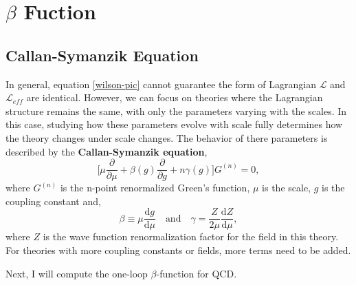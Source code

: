 \documentclass[a4paper,12pt]{article}
\renewcommand{\d}{\mathrm{d}}
\begin{document}
\section{$\beta$ Fuction\cite{Schwartz:2014sze,Peskin:1995ev}}
\subsection{Callan-Symanzik Equation}
In general, equation \eqref{wilson-pic} cannot guarantee the form of Lagrangian $\mathcal{L}$ and $\mathcal{L}_{eff}$ are identical. 
However, we can focus on theories where the Lagrangian structure remains the same, with only the parameters varying with the scales.
In this case, studying how these parameters evolve with scale fully determines how the theory changes under scale changes.
The behavior of there parameters is described by the \textbf{Callan-Symanzik equation},
\begin{equation}
    \bigg[\mu\frac{\partial}{\partial \mu}+\beta(g)\frac{\partial}{\partial g}+n \gamma(g)\bigg]G^{(n)}=0,
\end{equation}
where $G^{(n)}$ is the n-point renormalized Green's function, $\mu$ is the scale, $g$ is the coupling constant and,
\begin{equation}
    \beta \equiv \mu\frac{\d g}{\d \mu}\quad\text{and}\quad \gamma=\frac{Z}{2\mu}\frac{\d Z}{\d \mu},
\end{equation}
where $Z$ is the wave function renormalization factor for the field in this theory. 
For theories with more coupling constants or fields, more terms need to be added.\par
Next, I will compute the one-loop $\beta$-function for QCD.\par
\end{document}
